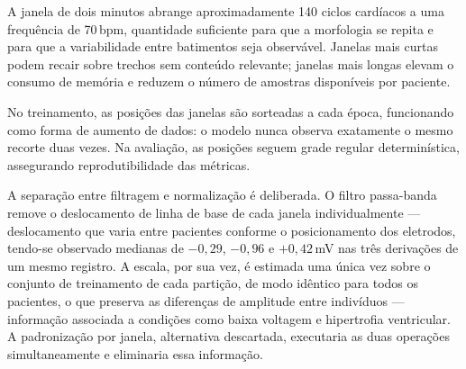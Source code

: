 \begin{table}[h!]
	\captionsetup{width=14cm}
\end{table}

A janela de dois minutos abrange aproximadamente 140 ciclos cardíacos a uma
frequência de 70\,bpm, quantidade suficiente para que a morfologia se repita
e para que a variabilidade entre batimentos seja observável. Janelas mais
curtas podem recair sobre trechos sem conteúdo relevante; janelas mais longas
elevam o consumo de memória e reduzem o número de amostras disponíveis por
paciente.

No treinamento, as posições das janelas são sorteadas a cada época,
funcionando como forma de aumento de dados: o modelo nunca observa
exatamente o mesmo recorte duas vezes. Na avaliação, as posições seguem grade
regular determinística, assegurando reprodutibilidade das métricas.

A separação entre filtragem e normalização é deliberada. O filtro
passa-banda remove o deslocamento de linha de base de cada janela
individualmente --- deslocamento que varia entre pacientes conforme o
posicionamento dos eletrodos, tendo-se observado medianas de $-0{,}29$,
$-0{,}96$ e $+0{,}42$\,mV nas três derivações de um mesmo registro. A escala,
por sua vez, é estimada uma única vez sobre o conjunto de treinamento de cada
partição, de modo idêntico para todos os pacientes, o que preserva as
diferenças de amplitude entre indivíduos --- informação associada a condições
como baixa voltagem e hipertrofia ventricular. A padronização por janela,
alternativa descartada, executaria as duas operações simultaneamente e
eliminaria essa informação.

